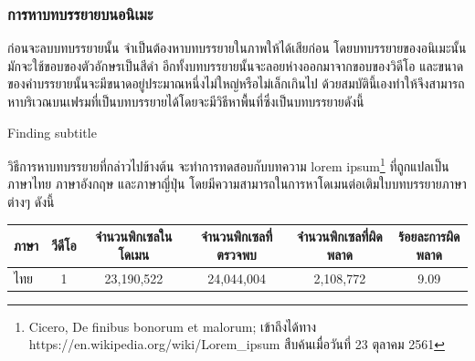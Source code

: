 \documentclass[hidelinks, a4paper,12pt]{article}
\numberwithin{equation}{section}							%
\numberwithin{equation}{section}
\begin{document}
{	
	\subsubsection{การหาบทบรรยายบนอนิเมะ}	
	\hspace{1cm}ก่อนจะลบบทบรรยายนั้น จำเป็นต้องหาบทบรรยายในภาพให้ได้เสียก่อน โดยบทบรรยายของอนิเมะนั้น มักจะใช้ขอบของตัวอักษรเป็นสีดำ อีกทั้งบทบรรยายนั้นจะลอยห่างออกมาจากขอบของวิดีโอ และขนาดของคำบรรยายนั้นจะมีขนาดอยู่ประมาณหนึ่งไม่ใหญ่หรือไม่เล็กเกินไป ด้วยสมบัตินี้เองทำให้จึงสามารถหาบริเวณบนเฟรมที่เป็นบทบรรยายได้โดยจะมีวิธีหาพื้นที่ซึ่งเป็นบทบรรยายดังนี้
	
	\vspace{1cm}
	
	\begin{algorithm}[H]
		\caption{Finding subtitle}
		\SetAlgoNoLine
	\end{algorithm}
	\clearpage
	\hspace{1cm} วิธีการหาบทบรรยายที่กล่าวไปข้างต้น จะทำการทดสอบกับบทความ lorem ipsum\footnote{Cicero, De finibus bonorum et malorum; เข้าถึงได้ทาง https://en.wikipedia.org/wiki/Lorem\_ipsum สืบค้นเมื่อวันที่ 23 ตุลาคม 2561} ที่ถูกแปลเป็นภาษาไทย ภาษาอังกฤษ และภาษาญี่ปุ่น โดยมีความสามารถในการหาโดเมนต่อเติมใบบทบรรยายภาษาต่างๆ ดังนี้
	\begin{table}[H]
		\centering
		\footnotesize
		\begin{tabular}[ht]{|l|c|c|c|c|c|}
			\hline
			ภาษา  & วีดีโอ & จำนวนพิกเซลในโดเมน & จำนวนพิกเซลที่ตรวจพบ & จำนวนพิกเซลที่ผิดพลาด & ร้อยละการผิดพลาด \\
			\hline
			ไทย & 1 & 23,190,522  & 24,044,004 & 2,108,772 &9.09\\

\end{tabular}
\end{table}}
\end{document}
